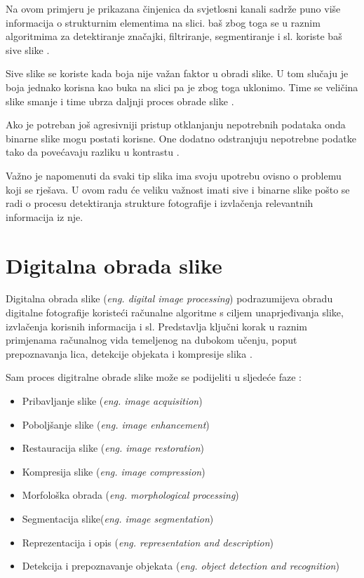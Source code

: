 \documentclass{foi}
\begin{document}
Na ovom primjeru je prikazana činjenica da svjetlosni kanali sadrže puno više informacija o strukturnim elementima na slici. baš zbog toga se u raznim algoritmima za detektiranje značajki, filtriranje, segmentiranje i sl. koriste baš sive slike \cite{LumVsChrom}. 

Sive slike se koriste kada boja nije važan faktor u obradi slike. U tom slučaju je boja jednako korisna kao buka na slici pa je zbog toga uklonimo. Time se veličina slike smanje i time ubrza daljnji proces obrade slike \cite{LumVsChrom}.

Ako je potreban još agresivniji pristup otklanjanju nepotrebnih podataka onda binarne slike mogu postati korisne. One dodatno odstranjuju nepotrebne podatke tako da povećavaju razliku u kontrastu \cite{LumVsChrom}.

Važno je napomenuti da svaki tip slika ima svoju upotrebu ovisno o problemu koji se rješava. U ovom radu će veliku važnost imati sive i binarne slike pošto se radi o procesu detektiranja strukture fotografije i izvlačenja relevantnih informacija iz nje.


\section{Digitalna obrada slike}

Digitalna obrada slike (\textit{eng. digital image processing}) podrazumijeva obradu digitalne fotografije koristeći računalne algoritme s ciljem unaprjeđivanja slike, izvlačenja korisnih informacija i sl. Predstavlja ključni korak u raznim primjenama računalnog vida temeljenog na dubokom učenju, poput prepoznavanja lica, detekcije objekata i kompresije slika \cite{ImageProcessing}. 

\begin{flushleft}
Sam proces digitralne obrade slike može se podijeliti u sljedeće faze \cite{ImageProcessing}:
\begin{itemize}
\item Pribavljanje slike (\textit{eng. image acquisition})
\item Poboljšanje slike (\textit{eng. image enhancement})
\item Restauracija slike (\textit{eng. image restoration})
\item Kompresija slike (\textit{eng. image compression})
\item Morfološka obrada (\textit{eng. morphological processing})
\item Segmentacija slike(\textit{eng. image segmentation})
\item Reprezentacija i opis (\textit{eng. representation and description})
\item Detekcija i prepoznavanje objekata (\textit{eng. object detection and recognition})
\end{itemize}
\end{flushleft}
\end{document}
